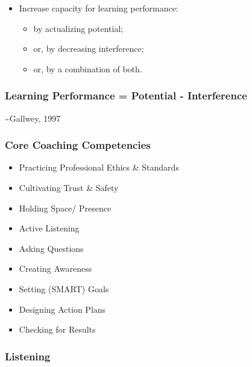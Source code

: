 \documentclass[
]{book}
\providecommand{\tightlist}{%
  \setlength{\itemsep}{0pt}\setlength{\parskip}{0pt}}
\begin{document}
\begin{itemize}
\tightlist
\item
  Increase capacity for learning performance:

  \begin{itemize}
  \tightlist
  \item
    by actualizing potential;
  \item
    or, by decreasing interference;
  \item
    or, by a combination of both.
  \end{itemize}
\end{itemize}

\hypertarget{learning-performance-potential---interference}{%
\subsubsection*{Learning Performance = Potential - Interference}\label{learning-performance-potential---interference}}

\textasciitilde Gallwey, 1997

\hypertarget{core-coaching-competencies}{%
\subsubsection*{Core Coaching Competencies}\label{core-coaching-competencies}}

\begin{itemize}
\tightlist
\item
  Practicing Professional Ethics \& Standards
\item
  Cultivating Trust \& Safety
\item
  Holding Space/ Presence
\item
  Active Listening
\item
  Asking Questions
\item
  Creating Awareness
\item
  Setting (SMART) Goals
\item
  Designing Action Plans
\item
  Checking for Results
\end{itemize}

\hypertarget{listening}{%
\subsubsection*{Listening}\label{listening}}
\end{document}
